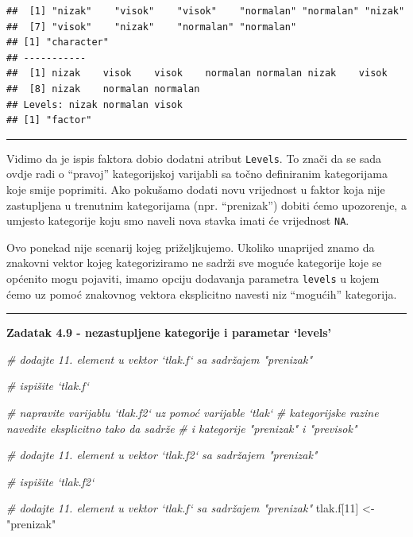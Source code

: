 \documentclass[]{book}
\newenvironment{Shaded}{\begin{snugshade}}{\end{snugshade}}
\newcommand{\DecValTok}[1]{\textcolor[rgb]{0.00,0.00,0.81}{#1}}
\newcommand{\StringTok}[1]{\textcolor[rgb]{0.31,0.60,0.02}{#1}}
\newcommand{\CommentTok}[1]{\textcolor[rgb]{0.56,0.35,0.01}{\textit{#1}}}
\newcommand{\NormalTok}[1]{#1}
\theoremstyle{definition}
\theoremstyle{definition}
\theoremstyle{definition}
\theoremstyle{remark}
\begin{document}
\begin{verbatim}
##  [1] "nizak"    "visok"    "visok"    "normalan" "normalan" "nizak"   
##  [7] "visok"    "nizak"    "normalan" "normalan"
## [1] "character"
## -----------
##  [1] nizak    visok    visok    normalan normalan nizak    visok   
##  [8] nizak    normalan normalan
## Levels: nizak normalan visok
## [1] "factor"
\end{verbatim}

\begin{center}\rule{0.5\linewidth}{\linethickness}\end{center}

Vidimo da je ispis faktora dobio dodatni atribut \texttt{Levels}. To
znači da se sada ovdje radi o ``pravoj'' kategorijskoj varijabli sa
točno definiranim kategorijama koje smije poprimiti. Ako pokušamo dodati
novu vrijednost u faktor koja nije zastupljena u trenutnim kategorijama
(npr. ``prenizak'') dobiti ćemo upozorenje, a umjesto kategorije koju
smo naveli nova stavka imati će vrijednost \texttt{NA}.

Ovo ponekad nije scenarij kojeg priželjkujemo. Ukoliko unaprijed znamo
da znakovni vektor kojeg kategoriziramo ne sadrži sve moguće kategorije
koje se općenito mogu pojaviti, imamo opciju dodavanja parametra
\texttt{levels} u kojem ćemo uz pomoć znakovnog vektora eksplicitno
navesti niz ``mogućih'' kategorija.

\begin{center}\rule{0.5\linewidth}{\linethickness}\end{center}

\textbf{Zadatak 4.9 - nezastupljene kategorije i parametar `levels'}

\begin{Shaded}
\begin{Highlighting}[]
\CommentTok{# dodajte 11. element u vektor `tlak.f` sa sadržajem "prenizak"}

\CommentTok{# ispišite `tlak.f`}

\CommentTok{# napravite varijablu `tlak.f2` uz pomoć varijable `tlak`}
\CommentTok{# kategorijske razine navedite eksplicitno tako da sadrže}
\CommentTok{# i kategorije "prenizak" i "previsok"}

\CommentTok{# dodajte 11. element u vektor `tlak.f2` sa sadržajem "prenizak"}

\CommentTok{# ispišite `tlak.f2`}
\end{Highlighting}
\end{Shaded}

\begin{Shaded}
\begin{Highlighting}[]
\CommentTok{# dodajte 11. element u vektor `tlak.f` sa sadržajem "prenizak"}
\NormalTok{tlak.f[}\DecValTok{11}\NormalTok{] <-}\StringTok{ "prenizak"}
\end{Highlighting}
\end{Shaded}
\end{document}
